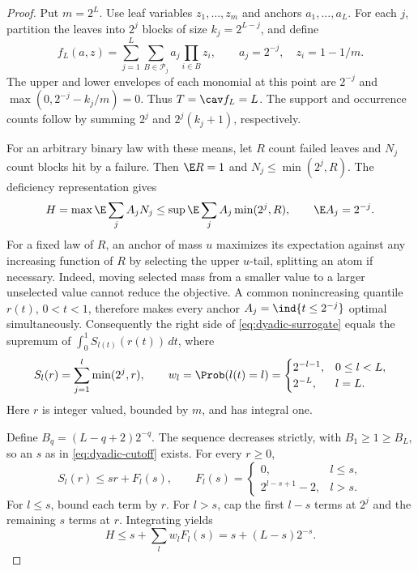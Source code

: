 \begin{proof}
Put $m=2^L$. Use leaf variables $z_1,\ldots,z_m$ and anchors
$a_1,\ldots,a_L$. For each $j$, partition the leaves into $2^j$ blocks
of size $k_j=2^{L-j}$, and define
\begin{equation}\label{eq:dyadic-polynomial}
 f_L(a,z)=\sum_{j=1}^L\sum_{B\in\mathcal P_j}
                   a_j\prod_{i\in B}z_i,
 \qquad a_j=2^{-j},\quad z_i=1-1/m.
\end{equation}
The upper and lower envelopes of each monomial at this point are $2^{-j}$
and $\max(0,2^{-j}-k_j/m)=0$. Thus $T=\cav f_L=L$.
The support and occurrence counts follow by summing $2^j$ and
$2^j(k_j+1)$, respectively.

For an arbitrary binary law with these means, let $R$ count failed leaves
and $N_j$ count blocks hit by a failure. Then $\E R=1$ and
$N_j\le\min(2^j,R)$. The deficiency representation gives
\begin{equation}\label{eq:dyadic-surrogate}
 H=\max\E\sum_j A_jN_j
 \le\sup\E\sum_j A_j\min(2^j,R),\qquad \E A_j=2^{-j}.
\end{equation}
For a fixed law of $R$, an anchor of mass $u$ maximizes its expectation
against any increasing function of $R$ by selecting the upper $u$-tail,
splitting an atom if necessary. Indeed, moving selected mass from a smaller
value to a larger unselected value cannot reduce the objective. A common
nonincreasing quantile $r(t)$, $0<t<1$, therefore makes every anchor
$A_j=\ind\{t\le2^{-j}\}$ optimal simultaneously. Consequently the right
side of \eqref{eq:dyadic-surrogate} equals the supremum of
$\int_0^1 S_{l(t)}(r(t))\,dt$, where
\[
 S_l(r)=\sum_{j=1}^l\min(2^j,r),\qquad
 w_l=\Prob(l(t)=l)=
 \begin{cases}2^{-l-1},&0\le l<L,\\2^{-L},&l=L.\end{cases}
\]
Here $r$ is integer valued, bounded by $m$, and has integral one.

Define $B_q=(L-q+2)2^{-q}$. The sequence decreases strictly, with
$B_1\ge1\ge B_L$, so an $s$ as in \eqref{eq:dyadic-cutoff} exists.
For every $r\ge0$,
\begin{equation}\label{eq:dyadic-affine-certificate}
 S_l(r)\le sr+F_l(s),\qquad
 F_l(s)=\begin{cases}0,&l\le s,\\2^{l-s+1}-2,&l>s.\end{cases}
\end{equation}
For $l\le s$, bound each term by $r$. For $l>s$, cap the first $l-s$
terms at $2^j$ and the remaining $s$ terms at $r$. Integrating yields
\[
 H\le s+\sum_lw_lF_l(s)=s+(L-s)2^{-s}.
\]


\end{proof}
